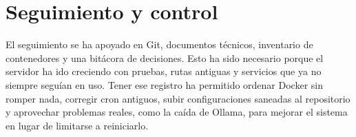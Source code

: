\section{Seguimiento y control}
El seguimiento se ha apoyado en Git, documentos técnicos, inventario de contenedores y una bitácora de decisiones. Esto ha sido necesario porque el servidor ha ido creciendo con pruebas, rutas antiguas y servicios que ya no siempre seguían en uso. Tener ese registro ha permitido ordenar Docker sin romper nada, corregir cron antiguos, subir configuraciones saneadas al repositorio y aprovechar problemas reales, como la caída de Ollama, para mejorar el sistema en lugar de limitarse a reiniciarlo.
